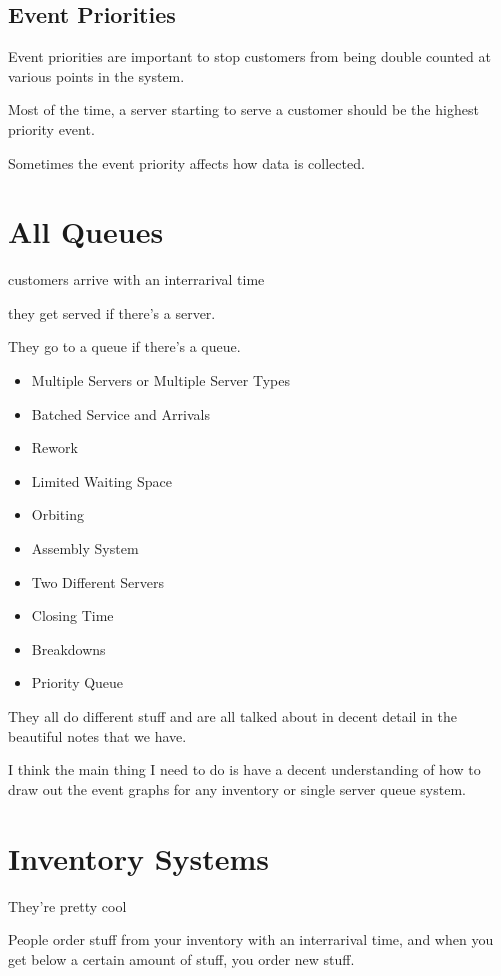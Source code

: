 \documentclass[fleqn]{report}
\begin{document}
\subsection{Event Priorities}
Event priorities are important to stop customers from being double 
counted at various points in the system. 

Most of the time, a server starting to serve a customer should be the 
highest priority event.

Sometimes the event priority affects how data is collected. 

\section{All Queues}
customers arrive with an interrarival time 

they get served if there's a server. 

They go to a queue if there's a queue.

\begin{itemize}
    \item 
    Multiple Servers or Multiple Server Types
    \item 
    Batched Service and Arrivals
    \item 
    Rework
    \item 
    Limited Waiting Space
    \item 
    Orbiting
    \item 
    Assembly System
    \item 
    Two Different Servers
    \item 
    Closing Time
    \item 
    Breakdowns
    \item 
    Priority Queue
\end{itemize}

They all do different stuff and are all talked about in decent detail 
in the beautiful notes that we have. 

I think the main thing I need to do is have a decent understanding 
of how to draw out the event graphs for any inventory or 
single server queue system. 

\section{Inventory Systems}
They're pretty cool 

People order stuff from your inventory with an interrarival time, 
and when you get below a certain 
amount of stuff, you order new stuff. 
\end{document}
